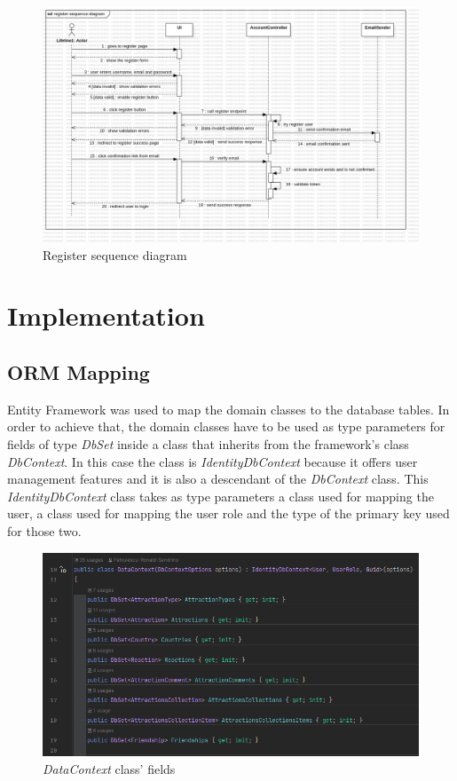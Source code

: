 \begin{figure}
    \centering
    \includegraphics[width=1\linewidth]{register-sequence-diagram.png}
    \caption{Register sequence diagram}
    \label{fig:enter-label}
\end{figure}

\section{Implementation}

\subsection{ORM Mapping}

\par Entity Framework was used to map the domain classes to the database tables. In order to achieve that, the domain classes have to be used as type parameters for fields of type \textit{DbSet} inside a class that inherits from the framework's class \textit{DbContext}. In this case the class is \textit{IdentityDbContext} because it offers user management features and it is also a descendant of the \textit{DbContext} class. This \textit{IdentityDbContext} class takes as type parameters a class used for mapping the user, a class used for mapping the user role and the type of the primary key used for those two.

\begin{figure}[!ht]
    \centering
    \includegraphics[width=1\linewidth]{4.3.1_dataContext.png}
    \caption{\textit{DataContext} class' fields}
    \label{fig:enter-label}
\end{figure}

